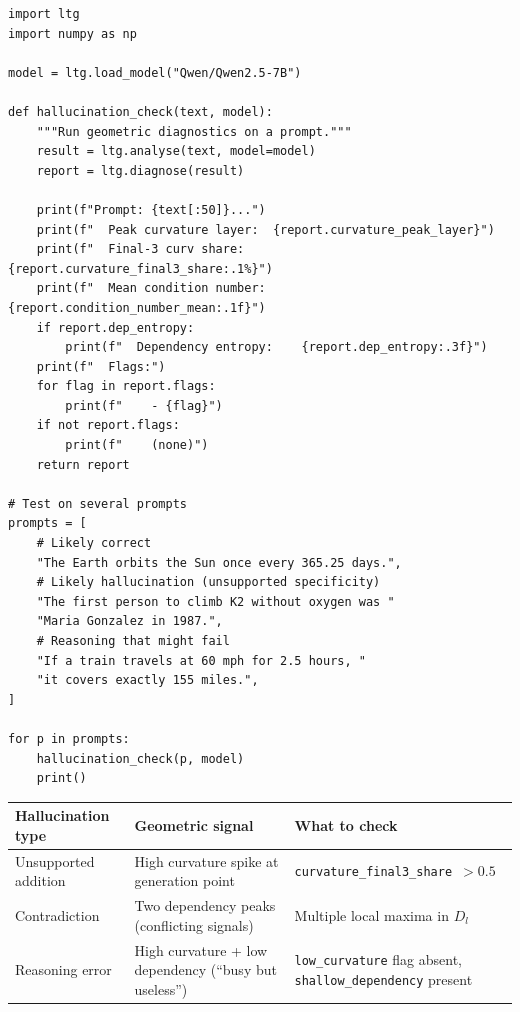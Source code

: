\documentclass[11pt, twoside, openright]{memoir}
\begin{document}
\begin{lstlisting}[caption={Geometric hallucination diagnostics}]
import ltg
import numpy as np

model = ltg.load_model("Qwen/Qwen2.5-7B")

def hallucination_check(text, model):
    """Run geometric diagnostics on a prompt."""
    result = ltg.analyse(text, model=model)
    report = ltg.diagnose(result)

    print(f"Prompt: {text[:50]}...")
    print(f"  Peak curvature layer:  {report.curvature_peak_layer}")
    print(f"  Final-3 curv share:    {report.curvature_final3_share:.1%}")
    print(f"  Mean condition number: {report.condition_number_mean:.1f}")
    if report.dep_entropy:
        print(f"  Dependency entropy:    {report.dep_entropy:.3f}")
    print(f"  Flags:")
    for flag in report.flags:
        print(f"    - {flag}")
    if not report.flags:
        print(f"    (none)")
    return report

# Test on several prompts
prompts = [
    # Likely correct
    "The Earth orbits the Sun once every 365.25 days.",
    # Likely hallucination (unsupported specificity)
    "The first person to climb K2 without oxygen was "
    "Maria Gonzalez in 1987.",
    # Reasoning that might fail
    "If a train travels at 60 mph for 2.5 hours, "
    "it covers exactly 155 miles.",
]

for p in prompts:
    hallucination_check(p, model)
    print()
\end{lstlisting}

\begin{center}
\renewcommand{\arraystretch}{1.4}\small
\begin{tabular}{@{}L{3cm} L{3.5cm} L{4cm}@{}}
\toprule
\textbf{Hallucination type} & \textbf{Geometric signal} & \textbf{What to check} \\
\midrule
Unsupported addition &
  High curvature spike at generation point &
  \texttt{curvature\_final3\_share $> 0.5$} \\
Contradiction &
  Two dependency peaks (conflicting signals) &
  Multiple local maxima in $D_l$ \\
Reasoning error &
  High curvature + low dependency (``busy but useless'') &
  \texttt{low\_curvature} flag absent, \texttt{shallow\_dependency} present \\
\bottomrule
\end{tabular}
\end{center}
\end{document}
